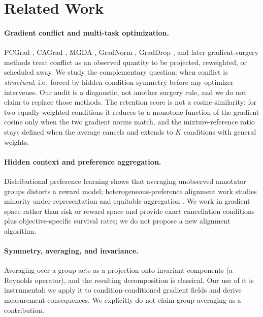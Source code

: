 \documentclass{article}
\begin{document}
\section{Related Work}
\label{sec:related}

\paragraph{Gradient conflict and multi-task optimization.}
PCGrad \citep{yu2020gradient}, CAGrad \citep{liu2021cagrad}, MGDA
\citep{sener2018multi}, GradNorm \citep{chen2018gradnorm}, GradDrop
\citep{chen2020just}, and later gradient-surgery methods treat conflict as an
observed quantity to be projected, reweighted, or scheduled away. We study the
complementary question: when conflict is \emph{structural}, i.e.\ forced by
hidden-condition symmetry before any optimizer intervenes. Our audit is a
diagnostic, not another surgery rule, and we do not claim to replace those
methods. The retention score is not a cosine similarity: for two equally
weighted conditions it reduces to a monotone function of the gradient cosine
only when the two gradient norms match, and the mixture-reference ratio stays
defined when the average cancels and extends to $K$ conditions with general
weights.

\paragraph{Hidden context and preference aggregation.}
Distributional preference learning \citep{siththaranjan2023distributional}
shows that averaging unobserved annotator groups distorts a reward model;
heterogeneous-preference alignment work studies minority under-representation
and equitable aggregation \citep{chakraborty2024maxmin}. We work in gradient
space rather than risk or reward space and provide exact cancellation
conditions plus objective-specific survival rates; we do not propose a new
alignment algorithm.

\paragraph{Symmetry, averaging, and invariance.}
Averaging over a group acts as a projection onto invariant components (a
Reynolds operator), and the resulting decomposition is classical. Our use of
it is instrumental: we apply it to condition-conditioned gradient fields and
derive measurement consequences. We explicitly do not claim group averaging as
a contribution.
\end{document}
